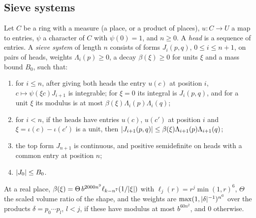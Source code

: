 \subsection{Sieve systems}\label{ss:sieve-systems}
Let $C$ be a ring with a measure (a place, or a product of places), $u\colon C\to U$ a map to entries, $\psi$ a character of $C$ with $\psi(0)=1$, and $n\ge0$. A \emph{head} is a sequence of
entries. A \emph{sieve system} of length $n$ consists of forms $J_i(p,q)$, $0\le i\le n+1$, on pairs of heads, weights $\Lambda_i(p)\ge0$, a decay $\beta(\xi)\ge0$ for units $\xi$ and a mass bound $B_0$, such that:
\begin{enumerate}[label=\textup{(S\arabic*)}]
\item for $i\le n$, after giving both heads the entry $u(c)$ at position $i$, $c\mapsto\psi(\xi c)J_{i+1}$ is integrable; for $\xi=0$ its integral is $J_i(p,q)$, and for a unit $\xi$ its modulus is at
most $\beta(\xi)\Lambda_i(p)\Lambda_i(q)$;
\item for $i<n$, if the heads have entries $u(c)$, $u(c')$ at position $i$ and $\xi=\iota(c)-\iota(c')$ is a unit, then $\lvert J_{i+1}(p,q)\rvert\le\beta(\xi)\Lambda_{i+1}(p)\Lambda_{i+1}(q)$;
\item the top form $J_{n+1}$ is continuous, and positive semidefinite on heads with a common entry at position $n$;
\item $\lvert J_0\rvert\le B_0$.
\end{enumerate}
At a real place, $\beta(\xi)=\Theta\,b^{2000n^9}\ell_{k-n^7}(1/\lvert \xi\rvert)$ with $\ell_j(r)=r^j\min(1,r)^6$, $\Theta$ the scaled volume ratio of the shape, and the weights are $\max(1,\lvert \delta\rvert^{-1})^{n^6}$ over the
products $\delta=p_0\cdots p_l$, $l<j$, if these have modulus at most $b^{60n^2}$, and $0$ otherwise.

